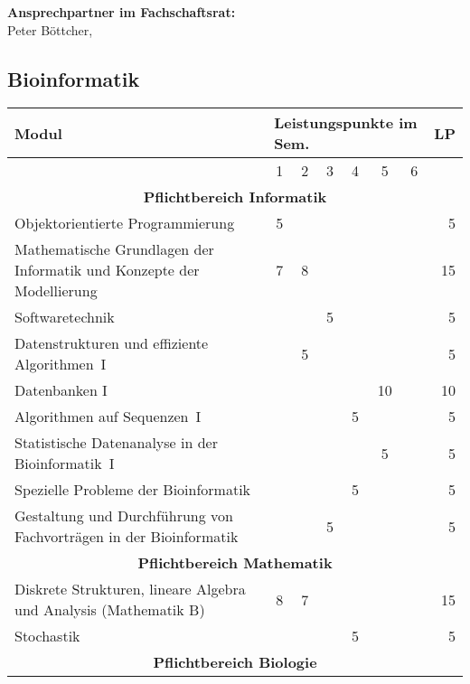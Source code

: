 \textbf{Ansprechpartner im Fachschaftsrat:}\\
Peter Böttcher, \\

\newpage

\subsection{Bioinformatik}
\label{studiengang_bioinformatik}

\begin{table}[tbp]
	\begin{small}
		\begin{tabularx}{\textwidth}{|X||c|c|c|c|c|c||r|}
			\hline
			\textbf{Modul}&\multicolumn{6}{l||}{\textbf{Leistungspunkte im Sem.}}&\textbf{LP}\\\hline
			&1&2&3&4&5&6&\\\hline\hline
			\multicolumn{8}{|c|}{\textbf{Pflichtbereich Informatik}}\\\hline
			Objektorientierte Programmierung&5&&&&&&5\\\hline
			Mathematische Grundlagen der Informatik und Konzepte der Modellierung&7&8&&&&&15\\\hline
			Softwaretechnik&&&5&&&&5\\\hline
			Datenstrukturen und effiziente Algorithmen~I&&5&&&&&5\\\hline
			Datenbanken I&&&&&10&&10\\\hline
			Algorithmen auf Sequenzen~I&&&&5&&&5\\\hline
			Statistische Datenanalyse in der Bioinformatik~I&&&&&5&&5\\\hline
			Spezielle Probleme der Bioinformatik &&&&5&&&5\\\hline
			Gestaltung und Durchführung von Fachvorträgen in der Bioinformatik &&&5&&&&5\\\hline\hline
			\multicolumn{8}{|c|}{\textbf{Pflichtbereich Mathematik}}\\\hline
			Diskrete Strukturen, lineare Algebra und Analysis (Mathematik B)&8&7&&&&&15\\\hline
			Stochastik&&&&5&&&5\\\hline\hline
			\multicolumn{8}{|c|}{\textbf{Pflichtbereich Biologie}}\\\hline

\end{tabularx}
\end{small}
\end{table}
